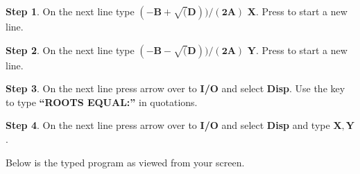 \documentclass{report}
\theoremstyle{definition}
\newtheorem{step}{\textbf{Step}}
\begin{document}
\vspace{-0.25cm}

\begin{step}
On the next line type $\mathbf{(-B+\sqrt{(}D))/(2A)}$   $\mathbf{X}$.  Press  to start a new line.  
\end{step}

\vspace{-0.25cm}

\begin{step}
On the next line type $\mathbf{(-B-\sqrt{(}D))/(2A)}$   $\mathbf{Y}$.  Press  to start a new line.  
\end{step}

\vspace{-0.25cm}

\begin{step}
On the next line press  arrow over to \textbf{I/O} and select \textbf{Disp}. Use the  key to type \textbf{``ROOTS EQUAL:''} in quotations.
\end{step}

\vspace{-0.25cm}

\begin{step}
On the next line press  arrow over to \textbf{I/O} and select \textbf{Disp} and type $\mathbf{X, Y}$. 
\end{step}

\vspace{-0.25cm}

\noindent Below is the typed program as viewed from your screen.

\vspace{-0.25cm}

\begin{center}
\end{center}
\end{document}
